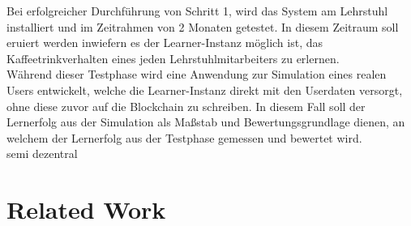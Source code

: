Bei erfolgreicher Durchführung von Schritt 1, wird das System am Lehrstuhl installiert und im Zeitrahmen von 2 Monaten getestet. In diesem Zeitraum soll eruiert werden inwiefern es der Learner-Instanz möglich ist, das Kaffeetrinkverhalten eines jeden Lehrstuhlmitarbeiters zu erlernen. \\
Während dieser Testphase wird eine Anwendung zur Simulation eines realen Users entwickelt, welche die Learner-Instanz direkt mit den Userdaten versorgt, ohne diese zuvor auf die Blockchain zu schreiben. In diesem Fall soll der Lernerfolg aus der Simulation als Maßstab und Bewertungsgrundlage dienen, an welchem der Lernerfolg aus der Testphase gemessen und bewertet wird.\\

semi dezentral



\section{Related Work}
%

%

